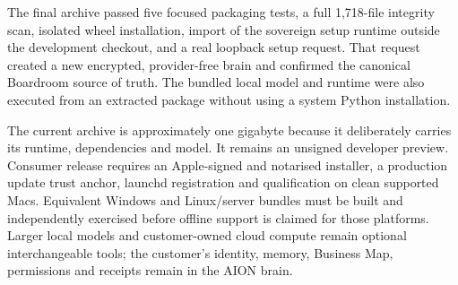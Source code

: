 The final archive passed five focused packaging tests, a full 1,718-file integrity scan, isolated
wheel installation, import of the sovereign setup runtime outside the development checkout, and a
real loopback setup request. That request created a new encrypted, provider-free brain and
confirmed the canonical Boardroom source of truth. The bundled local model and runtime were also
executed from an extracted package without using a system Python installation.

The current archive is approximately one gigabyte because it deliberately carries its runtime,
dependencies and model. It remains an unsigned developer preview. Consumer release requires an
Apple-signed and notarised installer, a production update trust anchor, launchd registration and
qualification on clean supported Macs. Equivalent Windows and Linux/server bundles must be built
and independently exercised before offline support is claimed for those platforms. Larger local
models and customer-owned cloud compute remain optional interchangeable tools; the customer's
identity, memory, Business Map, permissions and receipts remain in the AION brain.
